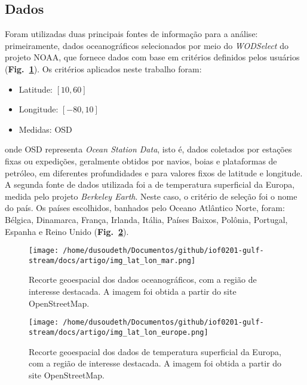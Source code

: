 \documentclass[journal]{IEEEtran}
\newcommand{\figref}[1]{(\textbf{Fig.~\ref{#1}})}
\begin{document}
        \subsection{Dados}
            Foram utilizadas duas principais fontes de informação para a análise: primeiramente, dados oceanográficos selecionados por meio do \textit{WODSelect} do projeto NOAA\cite{noaa_ncei_world_ocean_db_2024}, que fornece dados com base em critérios definidos pelos usuários \figref{fig:img_lat_lon_mar}. Os critérios aplicados neste trabalho foram:
            \begin{itemize}
                \item Latitude: $[10, 60]$
                \item Longitude: $[-80, 10]$
                \item Medidas: OSD
            \end{itemize}
            onde OSD representa \textit{Ocean Station Data}, isto é, dados coletados por estações fixas ou expedições, geralmente obtidos por navios, boias e plataformas de petróleo, em diferentes profundidades e para valores fixos de latitude e longitude. A segunda fonte de dados utilizada foi a de temperatura superficial da Europa, medida pelo projeto \textit{Berkeley Earth}\cite{berkeley_earth_surface_temp_2024}. Neste caso, o critério de seleção foi o nome do país. Os países escolhidos, banhados pelo Oceano Atlântico Norte, foram: Bélgica, Dinamarca, França, Irlanda, Itália, Países Baixos, Polônia, Portugal, Espanha e Reino Unido \figref{fig:img_lat_lon_europe}.
            \begin{figure}[ht]
                \centering
                \texttt{[image: /home/dusoudeth/Documentos/github/iof0201-gulf-stream/docs/artigo/img\_lat\_lon\_mar.png]}
                \caption{Recorte geoespacial dos dados oceanográficos, com a região de interesse destacada. A imagem foi obtida a partir do site OpenStreetMap.}
                \label{fig:img_lat_lon_mar}
            \end{figure}
            \begin{figure}[ht]
                \centering
                \texttt{[image: /home/dusoudeth/Documentos/github/iof0201-gulf-stream/docs/artigo/img\_lat\_lon\_europe.png]}
                \caption{Recorte geoespacial dos dados de temperatura superficial da Europa, com a região de interesse destacada. A imagem foi obtida a partir do site OpenStreetMap.}
                \label{fig:img_lat_lon_europe}
            \end{figure}
    
\end{document}
